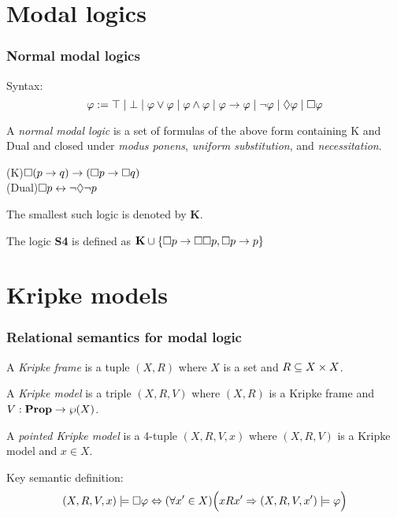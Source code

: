 \documentclass[
	11pt, %
	aspectratio=1610, %
]{beamer}
\begin{document}

\section{Modal logics}


\begin{frame}
	\frametitle{Normal modal logics}

		Syntax:
			\[ \varphi := \top
					\mid \bot
					\mid \varphi \lor \varphi
					\mid \varphi \land \varphi
					\mid \varphi \rightarrow \varphi
					\mid \neg \varphi
					\mid \Diamond \varphi
					\mid \Box \varphi \]

		\bigskip

		A \emph{normal modal logic} is a set of formulas of the above form containing K and Dual and closed under \emph{modus ponens}, \emph{uniform substitution}, and \emph{necessitation}.

		\bigskip

		(K)\hspace{1.03cm}$\Box (p \rightarrow q) \rightarrow (\Box p \rightarrow \Box q)$\\
		(Dual)\hspace{.5cm}$\Box p \leftrightarrow \neg \Diamond \neg p$

		\bigskip

		The smallest such logic is denoted by $\mathbf{K}$.

		\bigskip

		The logic \textbf{S4} is defined as $\mathbf{K} \cup \{\Box p \rightarrow \Box \Box p, \Box p \rightarrow p\}$

\end{frame}



\section{Kripke models}


\begin{frame}
	\frametitle{Relational semantics for modal logic}

	A \emph{Kripke frame} is a tuple $(X, R)$ where $X$ is a set and $R \subseteq X \times X$.

	\bigskip

	A \emph{Kripke model} is a triple $(X, R, V)$ where $(X, R)$ is a Kripke frame and $V: \mathbf{Prop} \to \wp(X)$.

	\bigskip

	A \emph{pointed Kripke model} is a 4-tuple $(X, R, V, x)$ where $(X, R, V)$ is a Kripke model and $x \in X$.

	\bigskip

	Key semantic definition:
		\[ (X, R, V, x) \models \Box \varphi \Leftrightarrow (\forall x' \in X)\Bigl(xRx' \Rightarrow (X, R, V, x') \models \varphi\Bigr) \]

\end{frame}
\end{document}
